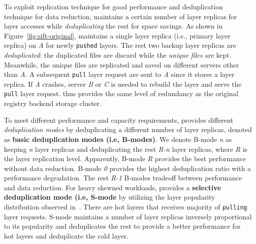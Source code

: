To exploit replication technique for good performance and deduplication technique for data reduction,
\sysname maintains a certain number of layer replicas for layer accesses 
while \emph{deduplicating} the rest for space savings.
As shown in Figure~\ref{fig:sift-original},
\sysname maintains a single layer replica (i.e., primary layer replica) on \emph{A} for newly 
\texttt{pushed} layers.
%
The rest two backup layer replicas %
are \emph{deduplicated}: 
the duplicated files are discard while the \emph{unique files} are kept.
Meanwhile,
the unique files are replicated and saved on different servers other than \emph{A}.
%
A subsequent \texttt{pull} layer request are sent to \emph{A} since it stores a layer replica.
If \emph{A} crashes,
server \emph{B} or \emph{C} is needed to rebuild the layer and serve the \texttt{pull} layer request. %
\sysname thus provides the same level of redundancy as the original registry backend storage cluster. 

To meet different performance and capacity requirements,
\sysname provides different \emph{deduplication modes} by deduplicating a different number of layer replicas, denoted as
\textbf{basic deduplication modes (i.e, B-modes)}.
We denote B-mode \emph{n} as keeping \emph{n} layer replicas and deduplicating the rest \emph{R-n} layer replicas, 
where \emph{R} is the layer replication level.
Apparently,
B-mode \emph{R} provides the best performance without data reduction.
B-mode \emph{0} provides the highest deduplication ratio with a performance degradation.
The rest \emph{R-1} B-modes tradeoff 
between performance and data reduction.
For heavy skewned workloads,
\sysname provides a \textbf{selective deduplication mode (i.e, S-mode}
by 
utilizing the layer popularity distribution observed in~\cite{dockerworkload}.
There are hot layers that receives majority of \texttt{pulling} layer requests.
S-mode
maintains a number of layer replicas inversely proportional to its popularity
and deduplicates the rest
to provide a better performance for hot layers
and deduplicate the cold layer.

